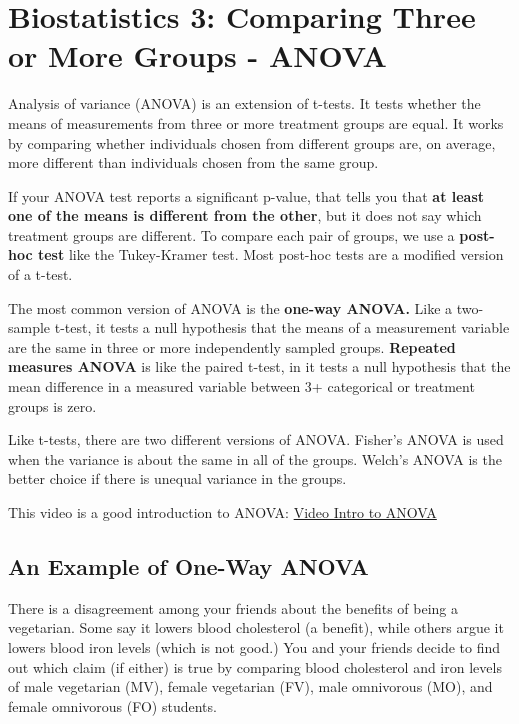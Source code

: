 \documentclass[
]{book}
\begin{document}
\hypertarget{compstatstwo473}{%
\chapter{Biostatistics 3: Comparing Three or More Groups - ANOVA}\label{compstatstwo473}}

Analysis of variance (ANOVA) is an extension of t-tests. It tests whether the means of measurements from three or more treatment groups are equal. It works by comparing whether individuals chosen from different groups are, on average, more different than individuals chosen from the same group.

If your ANOVA test reports a significant p-value, that tells you that \textbf{at least one of the means is different from the other}, but it does not say which treatment groups are different. To compare each pair of groups, we use a \textbf{post-hoc test} like the Tukey-Kramer test. Most post-hoc tests are a modified version of a t-test.

The most common version of ANOVA is the \textbf{one-way ANOVA.} Like a two-sample t-test, it tests a null hypothesis that the means of a measurement variable are the same in three or more independently sampled groups. \textbf{Repeated measures ANOVA} is like the paired t-test, in it tests a null hypothesis that the mean difference in a measured variable between 3+ categorical or treatment groups is zero.

Like t-tests, there are two different versions of ANOVA. Fisher's ANOVA is used when the variance is about the same in all of the groups. Welch's ANOVA is the better choice if there is unequal variance in the groups.

This video is a good introduction to ANOVA: \href{https://youtu.be/oOuu8IBd-yo}{Video Intro to ANOVA}

\hypertarget{an-example-of-one-way-anova}{%
\section{An Example of One-Way ANOVA}\label{an-example-of-one-way-anova}}

There is a disagreement among your friends about the benefits of being a vegetarian. Some say it lowers blood cholesterol (a benefit), while others argue it lowers blood iron levels (which is not good.) You and your friends decide to find out which claim (if either) is true by comparing blood cholesterol and iron levels of male vegetarian (MV), female vegetarian (FV), male omnivorous (MO), and female omnivorous (FO) students.
\end{document}
